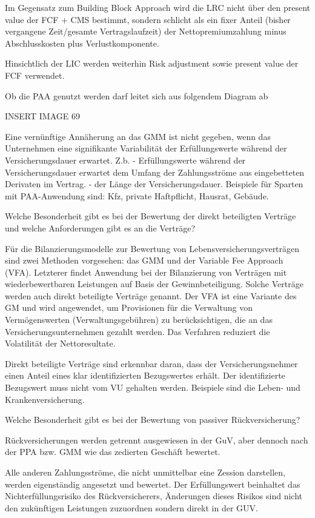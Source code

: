 Im Gegensatz zum Building Block Approach wird die LRC nicht über den present value der FCF + CMS bestimmt, 
sondern schlicht als ein fixer Anteil (bisher vergangene Zeit/gesamte Vertragslaufzeit) der Nettopremiumzahlung
minus Abschlusskosten plus Verlustkomponente.

Hinsichtlich der LIC werden weiterhin Risk adjustment sowie present value der FCF verwendet.

Ob die PAA genutzt werden darf leitet sich aus folgendem Diagram ab

INSERT IMAGE 69

Eine vernünftige Annäherung an das GMM ist nicht gegeben, wenn das Unternehmen eine signifikante Variabilität der
Erfüllungswerte während der Versicherungsdauer erwartet. Z.b.
- Erfüllungswerte während der Versicherungsdauer erwartet
 dem Umfang der Zahlungsströme aus eingebetteten Derivaten im Vertrag.
- der Länge der Versicherungsdauer.
Beispiele für Sparten mit PAA-Anwendung sind: Kfz, private Haftpflicht, Hausrat, Gebäude.


Welche Besonderheit gibt es bei der Bewertung der direkt beteiligten Verträge und welche Anforderungen gibt es an
die Verträge?

Für die Bilanzierungsmodelle zur Bewertung von Lebensversicherungsverträgen sind zwei Methoden vorgesehen: 
das GMM und der Variable Fee Approach (VFA). 
Letzterer findet Anwendung bei der Bilanzierung von Verträgen mit wiederbewertbaren Leistungen auf Basis der Gewinnbeteiligung. 
Solche Verträge werden auch direkt beteiligte Verträge genannt.
Der VFA ist eine Variante des GM und wird angewendet, um Provisionen für die Verwaltung von Vermögenswerten (Verwaltungsgebühren) zu berücksichtigen, 
die an das Versicherungsunternehmen gezahlt werden.
Das Verfahren reduziert die Volatilität der Nettoresultate.

Direkt beteiligte Verträge sind erkennbar daran, dass der Versicherungsnehmer einen
Anteil eines klar identifizierten Bezugswertes erhält.
Der identifizierte Bezugswert muss nicht vom VU gehalten werden. Beispiele sind die Leben- und Krankenversicherung.



Welche Besonderheit gibt es bei der Bewertung von passiver Rückversicherung?

Rückversicherungen werden getrennt ausgewiesen in der GuV, aber dennoch nach der PPA bzw. GMM 
wie das zedierten Geschäft bewertet.

Alle anderen Zahlungsströme, die nicht unmittelbar eine Zession
darstellen, werden eigenständig angesetzt und bewertet.
Der Erfüllungswert beinhaltet das Nichterfüllungsrisiko des
Rückversicherers, Änderungen dieses Risikos sind nicht den
zukünftigen Leistungen zuzuordnen sondern direkt in der GUV.

